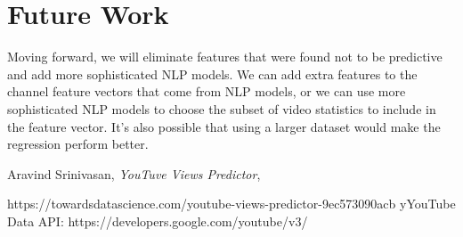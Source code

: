 \documentclass[12pt]{article}
\theoremstyle{definition}
\theoremstyle{remark}
\begin{document}
\section{Future Work}

Moving forward, we will eliminate features that were found not to be predictive
and add more sophisticated NLP models. We can add extra features to the channel
feature vectors that come from NLP models, or we can use more sophisticated NLP
models to choose the subset of video statistics to include in the feature vector.
It's also possible that using a larger dataset would make the regression perform better.

\begin{thebibliography}{99}

 Aravind Srinivasan, \emph{YouTuve Views Predictor}, 

    \qquad https://towardsdatascience.com/youtube-views-predictor-9ec573090acb
yYouTube Data API: https://developers.google.com/youtube/v3/



\end{thebibliography}
\end{document}
